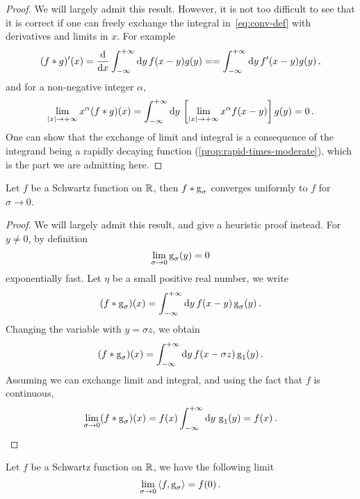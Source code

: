 \begin{proof}
  We will largely admit this result. However, it is not too difficult to see that it is
  correct if one can freely exchange the integral in~\cref{eq:conv-def} with derivatives
  and limits in $x$. For example
  \begin{equation}
    (f\ast g)'(x)=\frac{\mathrm{d}}{\mathrm{d} x}\int_{-\infty}^{+\infty}\mathrm{d}{y}\,f(x-y)g(y)=
    =\int_{-\infty}^{+\infty}\mathrm{d}{y}\,f'(x-y)g(y)\,,
  \end{equation}
  and for a non-negative integer $\alpha$,
  \begin{equation}
    \lim_{|x|\to+\infty}x^{\alpha}(f\ast g)(x)=
    \int_{-\infty}^{+\infty}\mathrm{d}{y}\,\left[\lim_{|x|\to+\infty}x^{\alpha}f(x-y)\right]g(y)=0\,.
  \end{equation}
  One can show that the exchange of limit and integral is a consequence of the integrand
  being a rapidly decaying function (\cref{prop:rapid-times-moderate}), which is the part
  we are admitting here.
\end{proof}
\begin{theorem}
  \label{thm:gaussian-unit}
  Let $f$ be a Schwartz function on $\mathbb{R}$, then $f\ast \operatorname{g}_{\sigma}$ converges uniformly
  to $f$ for $\sigma\to 0$.
\end{theorem}
\begin{proof}
  We will largely admit this result, and give a heuristic proof instead. For $y\neq 0$, by definition
  \begin{equation}
    \lim_{\sigma\to 0}\operatorname{g}_{\sigma}(y)=0
  \end{equation}
  exponentially fast. Let $\eta$ be a small positive real number, we write
  \begin{equation}
    (f\ast \operatorname{g}_{\sigma})(x)=\int_{-\infty}^{+\infty}\mathrm{d}{y}\,f(x-y)\operatorname{g}_{\sigma}(y)\,.
  \end{equation}
  Changing the variable with $y=\sigma z$, we obtain
  \begin{equation}
    (f\ast \operatorname{g}_{\sigma})(x)=\int_{-\infty}^{+\infty}\mathrm{d}{y}\,f(x-\sigma z)\operatorname{g}_{1}(y)\,.
  \end{equation}
  Assuming we can exchange limit and integral, and using the fact that $f$ is continuous,
  \begin{equation}
    \lim_{\sigma\to 0}(f\ast \operatorname{g}_{\sigma})(x)=f(x)\int_{-\infty}^{+\infty}\mathrm{d}{y}\,\operatorname{g}_{1}(y)=f(x)\,.
  \end{equation}
\end{proof}
\begin{corollary}
  Let $f$ be a Schwartz function on $\mathbb{R}$, we have the following limit
  \begin{equation}
    \lim_{\sigma\to0}\braket{f,\operatorname{g}_{\sigma}}=f(0)\,.
  \end{equation}
\end{corollary}
